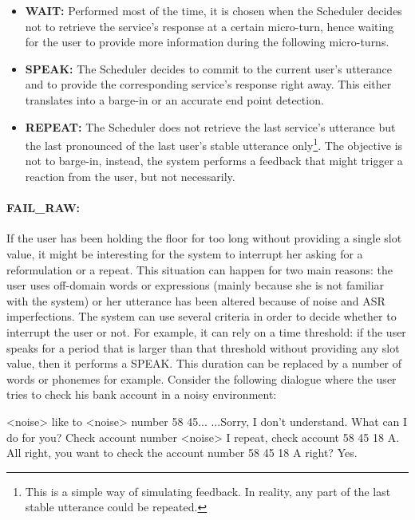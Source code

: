      \begin{itemize}
       \item \textbf{WAIT:} Performed most of the time, it is chosen when the Scheduler decides not to retrieve the service's response at a certain micro-turn, hence waiting for the user to provide more information during the following micro-turns.
       \item \textbf{SPEAK:} The Scheduler decides to commit to the current user's utterance and to provide the corresponding service's response right away. This either translates into a barge-in or an accurate end point detection.
       \item \textbf{REPEAT:} The Scheduler does not retrieve the last service's utterance but the last pronounced of the last user's stable utterance only\footnote{This is a simple way of simulating feedback. In reality, any part of the last stable utterance could be repeated.}. The objective is not to barge-in, instead, the system performs a feedback that might trigger a reaction from the user, but not necessarily.
     \end{itemize}

     \paragraph{FAIL\_RAW:} If the user has been holding the floor for too long without providing a single slot value, it might be interesting for the system to interrupt her asking for a reformulation or a repeat. This situation can happen for two main reasons: the user uses off-domain words or expressions (mainly because she is not familiar with the system) or her utterance has been altered because of noise and ASR imperfections. The system can use several criteria in order to decide whether to interrupt the user or not. For example, it can rely on a time threshold: if the user speaks for a period that is larger than that threshold without providing any slot value, then it performs a SPEAK. This duration can be replaced by a number of words or phonemes for example. Consider the following dialogue where the user tries to check his bank account in a noisy environment:

          \begin{dialogue}
             <noise> like to <noise> number 58 45...
             ...Sorry, I don't understand. What can I do for you?
             Check account number <noise> I repeat, check account 58 45 18 A.
             All right, you want to check the account number 58 45 18 A right?
             Yes.
          \end{dialogue}

